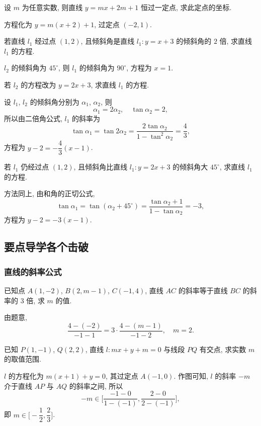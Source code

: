 \begin{exercise}
    设 $m$ 为任意实数, 则直线 $y=mx+2m+1$ 恒过一定点, 求此定点的坐标.
\end{exercise}
\beginsolution
    方程化为 $y= m(x+2)+ 1$, 过定点 $(-2,1)$.
\endsolution

\begin{exercise}
    若直线 $l_1$ 经过点 $(1, 2)$, 且倾斜角是直线 $l_1\colon y=x+3$ 的倾斜角的 $2$ 倍, 求直线 $l_1$ 的方程.
\end{exercise}
\beginsolution
    $l_2$ 的倾斜角为 $45^\circ$, 则 $l_1$ 的倾斜角为 $90^\circ$, 方程为 $x=1$.

    \varexercise 若 $l_2$ 的方程改为 $y= 2x+3$, 求直线 $l_1$ 的方程.

    设 $l_1$, $l_2$ 的倾斜角分别为 $\alpha_1$, $\alpha_2$, 则
    \[\alpha_1= 2\alpha_2,\quad \tan\alpha_2= 2,\]
    所以由二倍角公式, $l_1$ 的斜率为
    \[\tan\alpha_1= \tan 2\alpha_2
        = \frac{2\tan\alpha_2}{1- \tan^2\alpha_2}
        = \frac43,\]
    方程为 $y-2= -\dfrac43(x-1)$.

    \varexercise 若 $l_1$ 仍经过点 $(1, 2)$, 且倾斜角比直线 $l_1\colon y= 2x+3$ 的倾斜角大 $45^\circ$, 求直线 $l_1$ 的方程.

    方法同上, 由和角的正切公式,
    \[\tan\alpha_1= \tan (\alpha_2+ 45^\circ)
        = \frac{\tan\alpha_2+ 1}{1- \tan\alpha_2}
        = -3,\]
    方程为 $y-2= -3(x-1)$.
\endsolution

\subsection{要点导学\quad 各个击破}
\subsubsection{直线的斜率公式}
\begin{example}
    已知点 $A(1, -2)$, $B(2, m-1)$, $C(-1, 4)$, 直线 $AC$ 的斜率等于直线 $BC$ 的斜率的 $3$ 倍, 求 $m$ 的值.
\end{example}
\beginsolution
    由题意,
    \[\frac{4-(-2)}{-1-1}= 3\cdot\frac{4-(m-1)}{-1-2},\quad m=2.\]
\endsolution

\begin{example}
    已知 $P(1, -1)$, $Q(2, 2)$, 直线 $l\colon mx+y+m=0$ 与线段 $PQ$ 有交点, 求实数 $m$ 的取值范围.
\end{example}
\beginsolution
    $l$ 的方程化为 $m(x+1)+y=0$, 其过定点 $A(-1,0)$. 作图可知, $l$ 的斜率 $-m$ 介于直线 $AP$ 与 $AQ$ 的斜率之间, 所以
    \[-m\in \biggl[\frac{-1-0}{1-(-1)}, \frac{2-0}{2-(-1)}\biggr],\]
    即 $m\in \biggl[-\dfrac12, \dfrac23\biggr]$.
\endsolution


